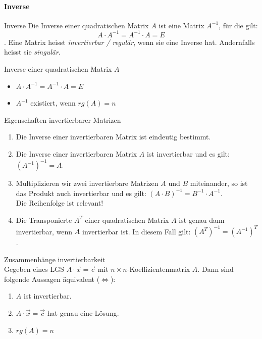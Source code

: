 \paragraph{Inverse}
    \begin{definition}{Inverse}
        Die Inverse einer quadratischen Matrix $A$ ist eine Matrix $A^{-1}$, für die gilt:
        \begin{equation*}
            A\cdot A^{-1}=A^{-1}\cdot A=E
        \end{equation*}.
        Eine Matrix heisst \textit{invertierbar / regulär}, wenn sie eine Inverse hat. 
        Andernfalls heisst sie \textit{singulär}.
    \end{definition}
    \begin{definition}{Inverse einer quadratischen Matrix $A$}
        \begin{itemize}
            \item $A \cdot A^{-1} = A^{-1} \cdot A = E$
            \item $A^{-1}$ existiert, wenn $rg(A) = n$
        \end{itemize}
    \end{definition}
    \begin{theorem}{Eigenschaften invertierbarer Matrizen}
        \begin{enumerate}
            \item Die Inverse einer invertierbaren Matrix ist eindeutig bestimmt.
            \item Die Inverse einer invertierbaren Matrix $A$ ist invertierbar und es gilt: $(A^{-1})^{-1}=A$.
            \item Multiplizieren wir zwei invertierbare Matrizen $A$ und $B$ miteinander, 
                so ist das Produkt auch invertierbar und es gilt: ${(A\cdot B)}^{-1}=B^{-1}\cdot A^{-1}$.\\
                Die Reihenfolge ist relevant!
            \item Die Transponierte $A^T$ einer quadratischen Matrix $A$ ist genau dann invertierbar, 
                wenn $A$ invertierbar ist. In diesem Fall gilt: ${(A^T)^{-1}}={(A^{-1})}^T$.
        \end{enumerate}
    \end{theorem}
    \begin{lemma}{Zusammenhänge invertierbarkeit}\\
        Gegeben eines LGS $A\cdot\vec{x}=\vec{c}$ mit $n\times n$-Koeffizientenmatrix $A$.
        Dann sind folgende Aussagen äquivalent ($\Leftrightarrow$):
        \begin{enumerate}
            \item $A$ ist invertierbar.
            \item $A\cdot\vec{x}=\vec{c}$ hat genau eine Lösung.
            \item $rg(A)=n$
        \end{enumerate}
    \end{lemma}








